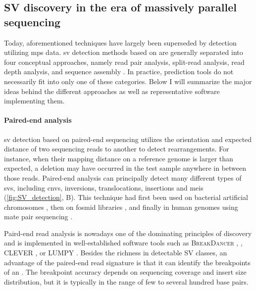 \subsection{SV discovery in the era of massively parallel sequencing}
\label{sec:sv_detection_ngs}

Today, aforementioned techniques have largely been superseded by \sv detection
utilizing \acl{mps} data.
\Ac{sv} detection methods based on \mps are generally
separated into four conceptual approaches, namely read pair analysis,
split-read analysis, read depth analysis, and sequence assembly \citep{Alkan2011}. In practice,
\sv prediction tools do not necessarily fit into only one of these categories.
Below I will summarize the major ideas behind the different approaches as well
as representative software implementing them.

\paragraph{Paired-end analysis}
\Ac{sv} detection based on paired-end sequencing utilizes the orientation and
expected distance of two sequencing reads to another to detect rearrangements.
For instance, when their mapping distance on a reference genome is larger than
expected, a deletion may have occurred in the test sample anywhere in between
those reads. Paired-end analysis can principally detect many different types of
\acp{sv}, including \acp{cnv}, inversions, translocations, insertions and
\acp{mei} (\cref{fig:SV_detection}, B). This technique had first been used on
bacterial artificial chromosomes
\citep{Volik2003}, then on fosmid libraries \citep{Tuzun2005}, and finally
in human genomes using mate pair
sequencing \citep{Korbel2007}.

Paird-end read analysis is nowadays one of the dominating principles of
\sv discovery and is implemented in well-established
software tools such as \textsc{BreakDancer} \citep{Chen2009}, \delly,
\textsc{CLEVER} \citep{Marschall2012}, or \textsc{LUMPY} \citep{Layer2014}.
Besides the richness in detectable SV classes, an advantage of the paired-end
read signature is that it can identify the breakpoints of an \sv. The breakpoint
accuracy depends on sequencing coverage and insert size distribution, but
it is typically in the range of few to several hundred base pairs.

